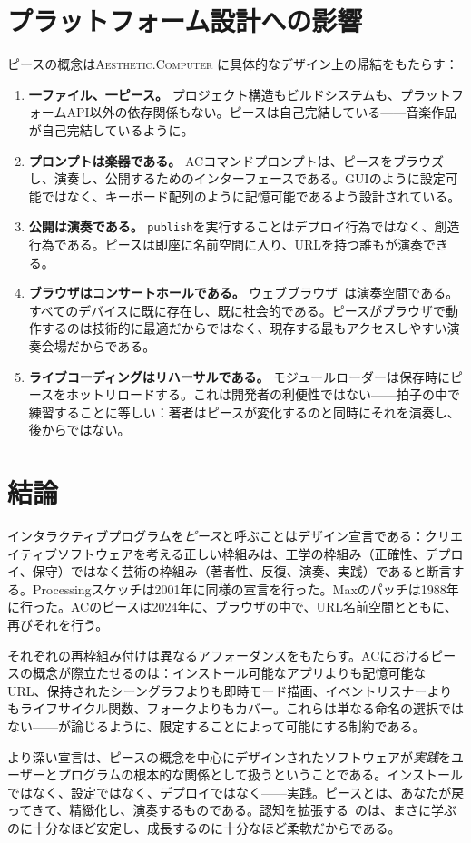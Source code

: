 \documentclass[10pt,letterpaper,twocolumn]{article}
\newcommand{\ac}{\textsc{Aesthetic.Computer}}
\begin{document}
\section{プラットフォーム設計への影響}

ピースの概念は\ac{} に具体的なデザイン上の帰結をもたらす：

\begin{enumerate}
  \item \textbf{一ファイル、一ピース。} プロジェクト構造もビルドシステムも、プラットフォームAPI以外の依存関係もない。ピースは自己完結している——音楽作品が自己完結しているように。
  \item \textbf{プロンプトは楽器である。} ACコマンドプロンプトは、ピースをブラウズし、演奏し、公開するためのインターフェースである。GUIのように設定可能ではなく、キーボード配列のように記憶可能であるよう設計されている。
  \item \textbf{公開は演奏である。} \texttt{publish}を実行することはデプロイ行為ではなく、創造行為である。ピースは即座に名前空間に入り、URLを持つ誰もが演奏できる。
  \item \textbf{ブラウザはコンサートホールである。} ウェブブラウザ~\citep{wyse2013viability}は演奏空間である。すべてのデバイスに既に存在し、既に社会的である。ピースがブラウザで動作するのは技術的に最適だからではなく、現存する最もアクセスしやすい演奏会場だからである。
  \item \textbf{ライブコーディングはリハーサルである。} モジュールローダーは保存時にピースをホットリロードする。これは開発者の利便性ではない——拍子の中で練習することに等しい：著者はピースが変化するのと同時にそれを演奏し、後からではない。
\end{enumerate}

\section{結論}

インタラクティブプログラムを\emph{ピース}と呼ぶことはデザイン宣言である：クリエイティブソフトウェアを考える正しい枠組みは、工学の枠組み（正確性、デプロイ、保守）ではなく芸術の枠組み（著者性、反復、演奏、実践）であると断言する。Processingスケッチは2001年に同様の宣言を行った。Maxのパッチは1988年に行った。ACのピースは2024年に、ブラウザの中で、URL名前空間とともに、再びそれを行う。

それぞれの再枠組み付けは異なるアフォーダンスをもたらす。ACにおけるピースの概念が際立たせるのは：インストール可能なアプリよりも記憶可能なURL、保持されたシーングラフよりも即時モード描画、イベントリスナーよりもライフサイクル関数、フォークよりもカバー。これらは単なる命名の選択ではない——\citet{magnusson2010designing}が論じるように、限定することによって可能にする制約である。

より深い宣言は、ピースの概念を中心にデザインされたソフトウェアが\emph{実践}をユーザーとプログラムの根本的な関係として扱うということである。インストールではなく、設定ではなく、デプロイではなく——実践。ピースとは、あなたが戻ってきて、精緻化し、演奏するものである。認知を拡張する~\citep{clark1998extended}のは、まさに学ぶのに十分なほど安定し、成長するのに十分なほど柔軟だからである。



\end{document}
